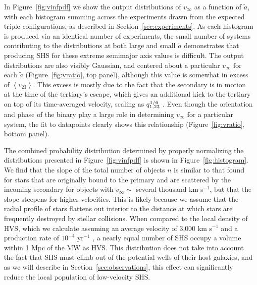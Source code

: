\documentclass[a4paper,twocolumn]{emulateapj}
\begin{document}
{In Figure~\ref{fig:vinfpdf} we show the output distributions of $v_{\infty}$ as a function of $\tilde{a}$, with each histogram summing across the experiments drawn from the expected triple configurations, as described in Section~\ref{sec:experiments}. As each histogram is produced via an identical number of experiments, the small number of systems contributing to the distributions at both large and small $\tilde{a}$ demonstrates that producing SHS for these extreme semimajor axis values is difficult. The output distributions are also visibly Gaussian, and centered about a particular $v_{\infty}$ for each $\tilde{a}$ (Figure~\ref{fig:vratio}, top panel), although this value is somewhat in excess of $\left<v_{23}\right>$. This excess is mostly due to the fact that the secondary is in motion at the time of the tertiary's escape, which gives an additional kick to the tertiary on top of its time-averaged velocity, scaling as $q_{1,23}^{\smash{1/6}}$ \citep{Hills:1988a}. Even though the orientation and phase of the binary play a large role in determining $v_{\infty}$ for a particular system, the fit to datapoints clearly shows this relationship (Figure~\ref{fig:vratio}, bottom panel).

The combined probability distribution determined by properly normalizing the distributions presented in Figure~\ref{fig:vinfpdf} is shown in Figure~\ref{fig:histogram}. We find that the slope of the total number of objects $n$ is similar to that found for stars that are originally bound to the primary and are scattered by the incoming secondary \citep[see Figure~1 of][]{Sesana:2007b} for objects with $v_{\infty} \sim$ several thousand km s$^{-1}$, but that the slope steepens for higher velocities. This is likely because we assume that the radial profile of stars flattens out interior to the distance at which stars are frequently destroyed by stellar collisions. When compared to the local density of HVS, which we calculate assuming an average velocity of 3,000 km s$^{-1}$ \citep{Bromley:2006a} and a production rate of $10^{-4}$ yr$^{-1}$ \citep{Yu:2003a}, a nearly equal number of SHS occupy a volume within 1 Mpc of the MW as HVS. This distribution does not take into account the fact that SHS must climb out of the potential wells of their host galaxies, and as we will describe in Section~\ref{sec:observations}, this effect can significantly reduce the local population of low-velocity SHS.

}
\end{document}
